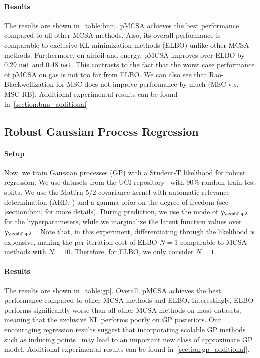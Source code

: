 \vspace{-0.1in}
\paragraph{Results}
The results are shown in~\cref{table:bnn}.
pMCSA achieves the best performance compared to all other MCSA methods.
Also, its overall performance is comparable to exclusive KL minimization methods (ELBO) unlike other MCSA methods.
Furthermore, on \textsf{airfoil} and \textsf{energy}, pMCSA improves over ELBO by 0.29 \texttt{nat} and 0.48 \texttt{nat}.
This contrasts to the fact that the worst case performance of pMCSA on \textsf{gas} is not too far from ELBO.
We can also see that Rao-Blackwellization for MSC does not improve performance by much (MSC v.s. MSC-RB).
Additional experimental results can be found in~\cref{section:bnn_additional}

  \vspace{-0.05in}
\subsection{Robust Gaussian Process Regression}\label{section:bgp}
  \vspace{-0.05in}
\paragraph{Setup}
Now, we train Gaussian processes (GP) with a Student-T likelihood for robust regression.
We use datasets from the UCI repository~\cite{Dua:2019} with 90\% random train-test splits.
We use the Mat\'ern 5/2 covariance kernel with automatic relevance determination (ARD, \citealt{neal_bayesian_1996}) and a gamma prior on the degree of freedom (see \cref{section:bnn} for more details).
During prediction, we use the mode of \(q_{\vlambda}\) for the hyperparameters, while we marginalize the latent function values over \(q_{\vlambda}\)~\citep{rasmussen_gaussian_2006}.
Note that, in this experiment, differentiating through the likelihood is expensive, making the per-iteration cost of ELBO \(N=1\) comparable to MCSA methods with \(N=10\).
Therefore, for ELBO, we only consider \(N=1\).

\vspace{-0.1in}
\paragraph{Results}
The results are shown in~\cref{table:gp}.
Overall, pMCSA achieves the best performance compared to other MCSA methods and ELBO.
Interestingly, ELBO performs significantly worse than all other MCSA methods on most datasets, meaning that the exclusive KL performs poorly on GP posteriors.
Our encouraging regression results suggest that incorporating scalable GP methods such as inducing points~\citep{NIPS2005_4491777b} may lead to an important new class of approximate GP model.
Additional experimental results can be found in~\cref{section:gp_additional}.

